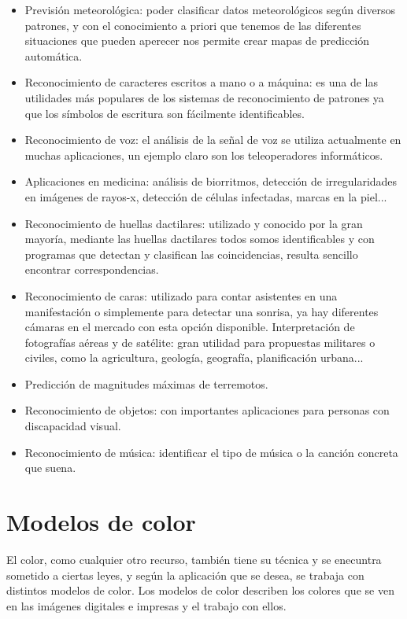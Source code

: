 \begin{itemize}
\item Previsión meteorológica: poder clasificar datos meteorológicos según diversos patrones, y con el conocimiento a priori que tenemos de las diferentes situaciones que pueden aperecer nos permite crear mapas de predicción automática.
\item Reconocimiento de caracteres escritos a mano o a máquina: es una de las utilidades más populares de los sistemas de reconocimiento de patrones ya que los símbolos de escritura son fácilmente identificables.
\item Reconocimiento de voz: el análisis de la señal de voz se utiliza actualmente en muchas aplicaciones, un ejemplo claro son los teleoperadores informáticos.
\item Aplicaciones en medicina: análisis de biorritmos, detección de irregularidades en imágenes de rayos-x, detección de células infectadas, marcas en la piel...
\item Reconocimiento de huellas dactilares: utilizado y conocido por la gran mayoría, mediante las huellas dactilares todos somos identificables y con programas que detectan y clasifican las coincidencias, resulta sencillo encontrar correspondencias.
\item Reconocimiento de caras: utilizado para contar asistentes en una manifestación o simplemente para detectar una sonrisa, ya hay diferentes cámaras en el mercado con esta opción disponible.
Interpretación de fotografías aéreas y de satélite: gran utilidad para propuestas militares o civiles, como la agricultura, geología, geografía, planificación urbana...
\item Predicción de magnitudes máximas de terremotos.
\item Reconocimiento de objetos: con importantes aplicaciones para personas con discapacidad visual.
\item Reconocimiento de música: identificar el tipo de música o la canción concreta que suena.
\end{itemize}


\section {Modelos de color}
\label{def:modelos-color}

El color, como cualquier otro recurso, también tiene su técnica y se enecuntra sometido a ciertas leyes, y según la aplicación que se desea, se trabaja con distintos modelos de color. Los modelos de color describen los colores que se ven en las imágenes digitales e impresas y el trabajo con ellos.\\

